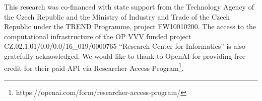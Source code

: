 \documentclass[11pt]{article}
\begin{document}
This research was co-financed with state support from the Technology Agency of the Czech Republic and the Ministry of Industry and Trade of the Czech Republic under the TREND Programme, project FW10010200.
The access to the computational infrastructure of the OP VVV funded project CZ.02.1.01/0.0/0.0/16\_019/0000765 ``Research Center for Informatics'' is also gratefully acknowledged.
We would like to thank to OpenAI for providing free credit for their paid API via Researcher Access Program\footnote{https://openai.com/form/researcher-access-program/}.






\appendix



\end{document}
